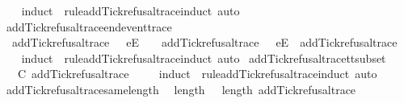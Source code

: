 \begin{isabellebody}
%
\isadelimproof
\ \ %
\endisadelimproof
%
\isatagproof
{}\isamarkupfalse%
\ {\isacharparenleft}induct\ {\isasymrho}\ rule{\isacharcolon}add{\isacharunderscore}Tick{\isacharunderscore}refusal{\isacharunderscore}trace{\isachardot}induct{\isacharcomma}\ auto{\isacharparenright}%
\endisatagproof
{\isafoldproof}%
%
\isadelimproof
\isanewline
%
\endisadelimproof
\isanewline
{}\isamarkupfalse%
\ add{\isacharunderscore}Tick{\isacharunderscore}refusal{\isacharunderscore}trace{\isacharunderscore}end{\isacharunderscore}event{\isacharunderscore}trace{\isacharcolon}\isanewline
\ \ {\isachardoublequoteopen}add{\isacharunderscore}Tick{\isacharunderscore}refusal{\isacharunderscore}trace\ {\isacharparenleft}{\isasymrho}\ {\isacharat}\ {\isacharbrackleft}e{\isacharbrackright}\isactrlsub E\ {\isacharhash}\ {\isasymsigma}{\isacharparenright}\ {\isacharequal}\ add{\isacharunderscore}Tick{\isacharunderscore}refusal{\isacharunderscore}trace\ {\isasymrho}\ {\isacharat}\ {\isacharbrackleft}e{\isacharbrackright}\isactrlsub E\ {\isacharhash}\ add{\isacharunderscore}Tick{\isacharunderscore}refusal{\isacharunderscore}trace\ {\isasymsigma}{\isachardoublequoteclose}\isanewline
%
\isadelimproof
\ \ %
\endisadelimproof
%
\isatagproof
{}\isamarkupfalse%
\ {\isacharparenleft}induct\ {\isasymrho}\ rule{\isacharcolon}add{\isacharunderscore}Tick{\isacharunderscore}refusal{\isacharunderscore}trace{\isachardot}induct{\isacharcomma}\ auto{\isacharparenright}%
\endisatagproof
{\isafoldproof}%
%
\isadelimproof
\isanewline
%
\endisadelimproof
\isanewline
{}\isamarkupfalse%
\ add{\isacharunderscore}Tick{\isacharunderscore}refusal{\isacharunderscore}trace{\isacharunderscore}tt{\isacharunderscore}subset{\isacharcolon}\isanewline
\ \ {\isachardoublequoteopen}{\isasymrho}\ {\isasymsubseteq}\isactrlsub C\ add{\isacharunderscore}Tick{\isacharunderscore}refusal{\isacharunderscore}trace\ {\isasymrho}{\isachardoublequoteclose}\isanewline
%
\isadelimproof
\ \ %
\endisadelimproof
%
\isatagproof
{}\isamarkupfalse%
\ {\isacharparenleft}induct\ {\isasymrho}\ rule{\isacharcolon}add{\isacharunderscore}Tick{\isacharunderscore}refusal{\isacharunderscore}trace{\isachardot}induct{\isacharcomma}\ auto{\isacharparenright}%
\endisatagproof
{\isafoldproof}%
%
\isadelimproof
\isanewline
%
\endisadelimproof
\isanewline
{}\isamarkupfalse%
\ add{\isacharunderscore}Tick{\isacharunderscore}refusal{\isacharunderscore}trace{\isacharunderscore}same{\isacharunderscore}length{\isacharcolon}\isanewline
\ \ {\isachardoublequoteopen}length\ {\isasymrho}\ {\isacharequal}\ length\ {\isacharparenleft}add{\isacharunderscore}Tick{\isacharunderscore}refusal{\isacharunderscore}trace\ {\isasymrho}{\isacharparenright}{\isachardoublequoteclose}\isanewline

\end{isabellebody}
